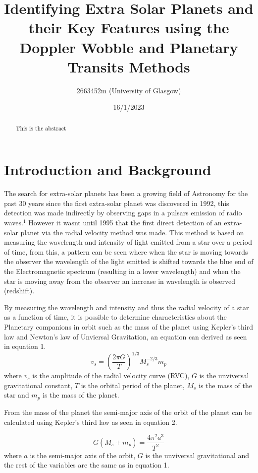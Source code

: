 \documentclass[]{article}
\title{\textbf{Identifying Extra Solar Planets and their Key Features using 
the Doppler Wobble and Planetary Transits Methods}}
\author{2663452m (University of Glasgow)}
\date{16/1/2023}
\begin{document}
\maketitle

\begin{abstract}
This is the abstract

\end{abstract}
\newpage



\twocolumn
\section*{Introduction and Background}
The search for extra-solar planets has been a growing field of Astronomy for the 
past 30 years since the first extra-solar planet was discovered in 1992, this 
detection was made indirectly by observing gaps in a pulsars emission of radio waves.$^1 $
However it wasnt until 1995 that the first direct detection of an extra-solar planet 
via the radial velocity method was made. This method is based on measuring the 
wavelength and intensity of light emitted from a star over a period of time, 
from this, a pattern can be seen where when the star is moving towards the observer
the wavelength of the light emitted is shifted towards the blue end of the 
Electromagnetic spectrum 
(resulting in a lower wavelength) and when the star is moving away from the observer
an increase in wavelength is observed (redshift). 
\par
By measuring the wavelength and intensity and thus the radial velocity of a star as 
a function of time, it is possible to determine characteristics about the Planetary
companions in orbit such as the mass of the planet using Kepler's third law and Newton's
law of Unviersal Gravitation, an equation can derived as seen in equation 1.
\begin{equation}\label{eq:mass of planet eq}
  v_s = \left(\frac{2\pi G}{T}\right)^{1/3}M_s^{-2/3}m_p
\end{equation}
where $v_s$ is the amplitude of the radial velocity curve (RVC), $G$ is the unviversal
gravitational constant, $T$ is the orbital period of the planet, $M_s$ is the mass of
the star and $m_p$ is the mass of the planet.
\par
From the mass of the planet the semi-major axis of the orbit of the planet can be 
calculated using Kepler's third law as seen in equation 2.

\begin{equation}\label{eq:semi-major axis eq}
  G(M_s+m_p) = \frac{4\pi^2a^3}{T^2}
\end{equation}
where $a$ is the semi-major axis of the orbit, $G$ is the unviversal gravitational
and the rest of the variables are the same as in equation 1.
\par
\end{document}
